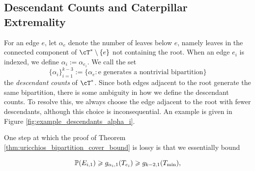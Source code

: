 \subsection{Descendant Counts and Caterpillar Extremality}
\label{sec:first-improvement-descendant-counts}

For an edge $e$, let $\alpha_e$ denote the number of leaves below $e$, namely leaves in the
connected component of $\cT^* \setminus \{e\}$ not containing the root. When an edge $e_i$ is
indexed, we define $\alpha_i := \alpha_{e_i}$. We call the set
%
    \[\{\alpha_i\}_{i=1}^{k-3} := \{\alpha_e : \text{e generates a nontrivial bipartition}\}\]
%
\noindent the \emph{descendant counts} of $\cT^*$. Since both edges adjacent to the root generate
the same bipartition, there is some ambiguity in how we define the descendant counts. To resolve this,
we always choose the edge adjacent to the root with fewer descendants, although this choice is inconsequential.
An example is given in Figure \ref{fig:example_descendants_alpha_i}.

One step at which the proof of Theorem \ref{thm:uricchios_bipartition_cover_bound} is lossy is that we essentially bound

\[\P(E_{i,1}) \geq g_{\alpha_{i}, 1}(T_{e_i}) \geq g_{k-2, 1}(T_{\mathrm{min}}),\]


